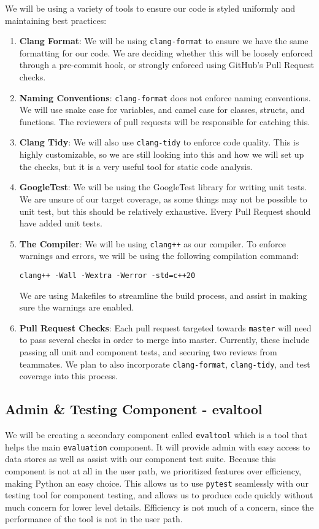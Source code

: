 We will be using a variety of tools to ensure our code is styled uniformly and maintaining best practices:
\begin{enumerate}
  \item \textbf{Clang Format}: We will be using \verb|clang-format| to ensure we have the same formatting for our code. We are deciding whether this will be loosely enforced through a pre-commit hook, or strongly enforced using GitHub's Pull Request checks.
  \item \textbf{Naming Conventions}: \verb|clang-format| does not enforce naming conventions. We will use snake case for variables, and camel case for classes, structs, and functions. The reviewers of pull requests will be responsible for catching this.
  \item \textbf{Clang Tidy}: We will also use \verb|clang-tidy| to enforce code quality. This is highly customizable, so we are still looking into this and how we will set up the checks, but it is a very useful tool for static code analysis.
  \item \textbf{GoogleTest}: We will be using the GoogleTest library for writing unit tests. We are unsure of our target coverage, as some things may not be possible to unit test, but this should be relatively exhaustive. Every Pull Request should have added unit tests.
  \item \textbf{The Compiler}: We will be using \verb|clang++| as our compiler. To enforce warnings and errors, we will be using the following compilation command:
  \begin{center}
    \verb|clang++ -Wall -Wextra -Werror -std=c++20|
  \end{center}
  We are using Makefiles to streamline the build process, and assist in making sure the warnings are enabled.
  \item \textbf{Pull Request Checks}: Each pull request targeted towards \verb|master| will need to pass several checks in order to merge into master. Currently, these include passing all unit and component tests, and securing two reviews from teammates. We plan to also incorporate \verb|clang-format|, \verb|clang-tidy|, and test coverage into this process. 
\end{enumerate}

\subsection*{Admin \& Testing Component - evaltool}

We will be creating a secondary component called \verb|evaltool| which is a tool that helps the main \verb|evaluation| component. It will provide admin with easy access to data stores as well as assist with our component test suite. Because this component is not at all in the user path, we prioritized features over efficiency, making Python an easy choice. This allows us to use \verb|pytest| seamlessly with our testing tool for component testing, and allows us to produce code quickly without much concern for lower level details. Efficiency is not much of a concern, since the performance of the tool is not in the user path.


